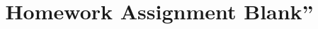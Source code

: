 \documentclass[12pt]{article}
\begin{document}
\date{\vspace{-5ex}}

\title{Homework Assignment Blank''}

\maketitle
\end{document}
